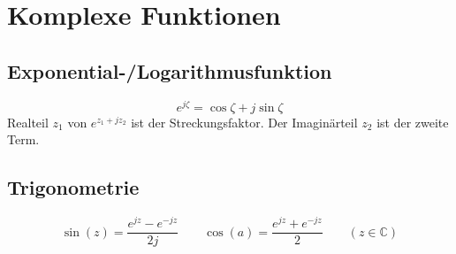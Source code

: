 \section{Komplexe Funktionen}
\subsection{Exponential-/Logarithmusfunktion}
\[e^{j\zeta}=\cos\zeta + j\sin\zeta\]
Realteil $z_1$ von $e^{z_1+jz_2}$ ist der Streckungsfaktor. Der Imaginärteil $z_2$ ist der zweite Term.

\subsection{Trigonometrie}
\[\sin(z) = \frac{e^{jz} -e^{-jz}}{2j} \qquad \cos(a) = \frac{e^{jz} +e^{-jz}}{2} \qquad (z \in \mathbb{C})\]